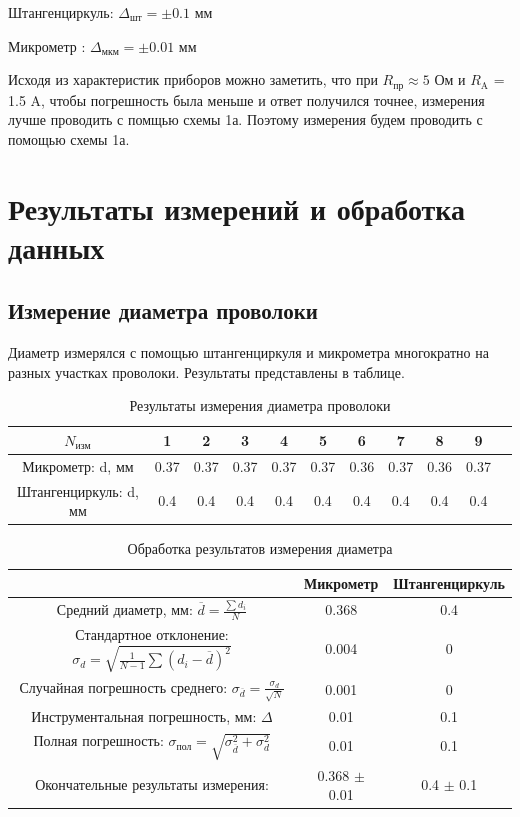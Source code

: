 \documentclass[a4paper,12pt]{article}
\begin{document}
Штангенциркуль: $\Delta_{\mbox{шт}} = \pm 0.1$ мм

Микрометр : $\Delta_{\mbox{мкм}} = \pm 0.01$ мм

Исходя из характеристик приборов можно заметить, что при $R_{\mbox{пр}}
\approx 5$ Ом и $R_{\mbox{A}}$ = 1.5 A, чтобы погрешность была меньше и ответ получился точнее, измерения лучше проводить с помщью схемы 1а.
Поэтому измерения будем проводить с помощью схемы 1а.

\section{Результаты измерений и обработка данных}
\subsection{Измерение диаметра проволоки}
Диаметр измерялся с помощью штангенциркуля и микрометра многократно на разных участках проволоки. Результаты представлены в таблице.
\begin{table}[H]
\label{Диаметр}
\caption{Результаты измерения диаметра проволоки}
\begin{tabular}{|c|c|c|c|c|c|c|c|c|c|c|}
\hline
$N_{\mbox{изм}}$ & 1 & 2 & 3 & 4 & 5 & 6 & 7 & 8 & 9\\
\hline
Микрометр: d, мм & 0.37 & 0.37 & 0.37 & 0.37 & 0.37 & 0.36 & 0.37 & 0.36 & 0.37 \\
\hline
Штангенциркуль: d, мм & 0.4 & 0.4 & 0.4 & 0.4 & 0.4 & 0.4 & 0.4 & 0.4 & 0.4 \\
\hline
\end{tabular}
\end{table}

\begin{table}[H]
\caption{Обработка результатов измерения диаметра}
\begin{tabular}{|c|c|c|}
\hline
 & Микрометр & Штангенциркуль \\
\hline
Средний диаметр, мм: $\overline{d}=\frac{\sum d_i}{N}$ & 0.368 & 0.4 \\
\hline
Стандартное отклонение: $\sigma_d=\sqrt{\frac{1}{N-1}\sum (d_i-\overline{d})^2}$ & 0.004&0 \\
\hline
Случайная погрешность среднего: $\sigma_{\overline{d}}=\frac{\sigma_d}{\sqrt{N}}$ & 0.001 & 0 \\
\hline
Инструментальная погрешность, мм: $\Delta$ & 0.01 & 0.1 \\
\hline
Полная погрешность: $\sigma_{\mbox{пол}}=\sqrt{\sigma_{\overline{d}}^2+\sigma_d^2}$ & 0.01 & 0.1 \\
\hline
Окончательные результаты измерения:  & 0.368 $\pm$ 0.01 & 0.4 $\pm$ 0.1 \\
\hline
\end{tabular}
\end{table}
\end{document}
